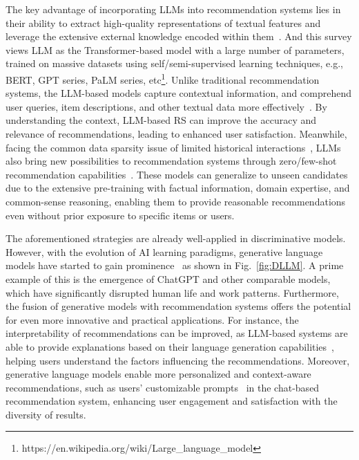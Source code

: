 \documentclass[sn-mathphys-num]{sn-jnl}%
\theoremstyle{thmstyleone}%
\theoremstyle{thmstyletwo}%
\theoremstyle{thmstylethree}%
\begin{document}
The key advantage of incorporating LLMs into recommendation systems lies in their ability to extract high-quality representations of textual features and leverage the extensive external knowledge encoded within them~\cite{liu2023pre}. And this survey views LLM as the Transformer-based model with a large number of parameters, trained on massive datasets using self/semi-supervised learning techniques, e.g., BERT, GPT series, PaLM series, etc\footnote{https://en.wikipedia.org/wiki/Large\_language\_model}. Unlike traditional recommendation systems, the LLM-based models capture contextual information, and comprehend user queries, item descriptions, and other textual data more effectively~\cite{DBLP:conf/recsys/Geng0FGZ22}. By understanding the context, LLM-based RS can improve the accuracy and relevance of recommendations, leading to enhanced user satisfaction. Meanwhile, facing the common data sparsity issue of limited historical interactions~\cite{da2020recommendation}, LLMs also bring new possibilities to recommendation systems through zero/few-shot recommendation capabilities~\cite{DBLP:conf/ecir/SileoVR22}. These models can generalize to unseen candidates due to the extensive pre-training with factual information, domain expertise, and common-sense reasoning, enabling them to provide reasonable recommendations even without prior exposure to specific items or users. 


The aforementioned strategies are already well-applied in discriminative models. However, with the evolution of AI learning paradigms, generative language models have started to gain prominence~\cite{zhao2023survey} as shown in Fig.~\ref{fig:DLLM}. A prime example of this is the emergence of ChatGPT and other comparable models, which have significantly disrupted human life and work patterns. Furthermore, the fusion of generative models with recommendation systems offers the potential for even more innovative and practical applications. For instance, the interpretability of recommendations can be improved, as LLM-based systems are able to provide explanations based on their language generation capabilities~\cite{DBLP:journals/corr/abs-2303-14524}, helping users understand the factors influencing the recommendations. Moreover, generative language models enable more personalized and context-aware recommendations, such as users' customizable prompts~\cite{li2023personalized} in the chat-based recommendation system, enhancing user engagement and satisfaction with the diversity of results.
\end{document}
